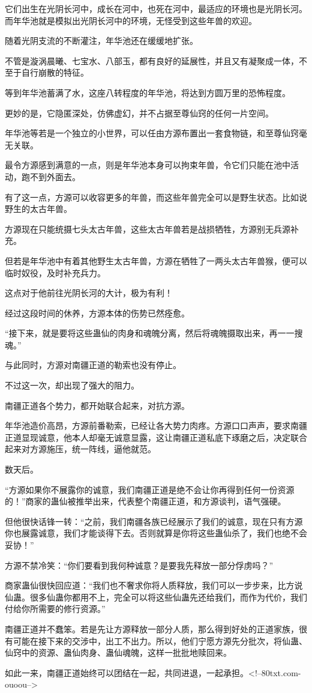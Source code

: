 \begin{this_body}
它们出生在光阴长河中，成长在河中，也死在河中，最适应的环境也是光阴长河。而年华池就是模拟出光阴长河中的环境，无怪受到这些年兽的欢迎。

随着光阴支流的不断灌注，年华池还在缓缓地扩张。

不管是漩涡晨曦、七宝水、八部玉，都有良好的延展性，并且又有凝聚成一体，不至于自行崩散的特征。

等到年华池蓄满了水，这座八转程度的年华池，将达到方圆万里的恐怖程度。

更妙的是，它隐匿深处，仿佛虚幻，并不占据至尊仙窍的任何一片空间。

年华池等若是一个独立的小世界，可以任由方源布置出一套食物链，和至尊仙窍毫无关联。

最令方源感到满意的一点，则是年华池本身可以拘束年兽，令它们只能在池中活动，跑不到外面去。

有了这一点，方源可以收容更多的年兽，而这些年兽完全可以是野生状态。比如说野生的太古年兽。

方源现在只能统摄七头太古年兽，这些太古年兽若是战损牺牲，方源别无兵源补充。

但若是年华池中有着其他野生太古年兽，方源在牺牲了一两头太古年兽猴，便可以临时奴役，及时补充兵力。

这点对于他前往光阴长河的大计，极为有利！

经过这段时间的休养，方源本体的伤势已然痊愈。

“接下来，就是要将这些蛊仙的肉身和魂魄分离，然后将魂魄摄取出来，再一一搜魂。”

与此同时，方源对南疆正道的勒索也没有停止。

不过这一次，却出现了强大的阻力。

南疆正道各个势力，都开始联合起来，对抗方源。

年华池造价高昂，方源前番勒索，已经让各大势力肉疼。方源口口声声，要求南疆正道显现诚意，他本人却毫无诚意显露，这让南疆正道私底下琢磨之后，决定联合起来对方源施压，统一阵线，逼他就范。

数天后。

“方源如果你不展露你的诚意，我们南疆正道是绝不会让你再得到任何一份资源的！”商家的蛊仙被推举出来，代表整个南疆正道，和方源谈判，语气强硬。

但他很快话锋一转：“之前，我们南疆各族已经展示了我们的诚意，现在只有方源你也展露诚意，我们才能谈得下去。否则就算是你将这些蛊仙杀了，我们也绝不会妥协！”

方源不禁冷笑：“你们要看到我何种诚意？是要我先释放一部分俘虏吗？”

商家蛊仙很快回应道：“我们也不奢求你将人质释放，我们可以一步步来，比方说仙蛊。很多仙蛊你都用不上，完全可以将这些仙蛊先还给我们，而作为代价，我们付给你所需要的修行资源。”

南疆正道并不蠢笨。若是先让方源释放一部分人质，那么得到好处的正道家族，很有可能在接下来的交涉中，出工不出力。所以，他们宁愿方源先分批次，将仙蛊、仙窍中的资源、蛊仙肉身、蛊仙魂魄，这样一批批地赎回来。

如此一来，南疆正道始终可以团结在一起，共同进退，一起承担。<!--80txt.com-ouoou-->

\end{this_body}

